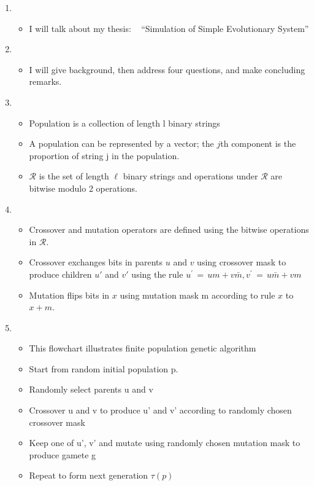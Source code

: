 \documentclass{article}
\begin{document}
\setcounter{page}{1}    
\newlength{\mywidth}
\setlength{\mywidth}{0.9\linewidth}
\newlength{\myheight}
\setlength{\myheight}{0.5in}
    
\begin{enumerate}
\item
  \begin{itemize}
  \item I will talk about my thesis: \hfill\mbox{ }\linebreak
      ``Simulation of Simple Evolutionary System'' 
  \end{itemize}
    
\item
  \begin{itemize}
  \item
      I will give background, then address four questions, and make
      concluding remarks.    
  \end{itemize}

\item
  \begin{itemize}
  \item Population is a collection of length l binary strings 
  \item A population can be represented by a vector; the $j$th component
      is the proportion of string j in the population.
    \item $\mathcal{R}$ is the set of length $\ell$ binary strings and operations under $\mathcal{R}$ are bitwise modulo 2 operations.
  \end{itemize}
    
\item
  \begin{itemize}
  \item Crossover and mutation operators are defined using the
    bitwise operations in $\mathcal{R}$.
  \item Crossover exchanges bits in parents $u$ and $v$ using crossover mask to produce children $u'$ and $v'$ 
  using the rule $u^\prime \,=\, um + v\bar{m} , v^\prime \,=\, u\bar{m} + vm$
  \item Mutation flips bits in $x$ using mutation mask m according to rule $x$ to $x + m$.
  \end{itemize}
    
\item
  \begin{itemize}
  \item This flowchart illustrates finite population genetic algorithm
  \item Start from random initial population p.
  \item Randomly select parents u and v 
  \item Crossover u and v to produce u' and v' according to randomly chosen crossover mask
  \item Keep one of u', v' and mutate using randomly chosen mutation mask to produce gamete g
  \item Repeat to form next generation $\tau(p)$
  \end{itemize}
  

\end{enumerate}
\end{document}
